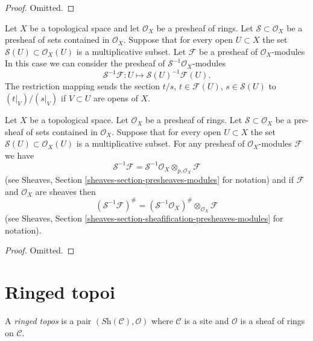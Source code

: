 \begin{proof}
Omitted.
\end{proof}

\noindent
Let $X$ be a topological space and let $\mathcal{O}_X$ be a
presheaf of rings. Let $\mathcal{S} \subset \mathcal{O}_X$
be a presheaf of sets contained in $\mathcal{O}_X$.
Suppose that for every open $U \subset X$ the set
$\mathcal{S}(U) \subset \mathcal{O}_X(U)$ is a multiplicative subset.
Let $\mathcal{F}$ be a presheaf of $\mathcal{O}_X$-modules
In this case we can consider the presheaf of
$\mathcal{S}^{-1}\mathcal{O}_X$-modules
$$
\mathcal{S}^{-1}\mathcal{F} :
U \longmapsto \mathcal{S}(U)^{-1}\mathcal{F}(U).
$$
The restriction mapping sends the section $t/s$, $t \in \mathcal{F}(U)$,
$s \in \mathcal{S}(U)$ to $(t|_V)/(s|_V)$ if $V \subset U$ are opens
of $X$.

\begin{lemma}
\label{lemma-simple-invert-module}
Let $X$ be a topological space.
Let $\mathcal{O}_X$ be a presheaf of rings.
Let $\mathcal{S} \subset \mathcal{O}_X$ be a pre-sheaf of sets contained
in $\mathcal{O}_X$. Suppose that for every open $U \subset X$ the set
$\mathcal{S}(U) \subset \mathcal{O}_X(U)$ is a multiplicative subset.
For any presheaf of $\mathcal{O}_X$-modules $\mathcal{F}$ we
have
$$
\mathcal{S}^{-1}\mathcal{F}
=
\mathcal{S}^{-1}\mathcal{O}_X \otimes_{p, \mathcal{O}_X} \mathcal{F}
$$
(see Sheaves, Section \ref{sheaves-section-presheaves-modules} for notation)
and if $\mathcal{F}$ and $\mathcal{O}_X$ are sheaves then
$$
(\mathcal{S}^{-1}\mathcal{F})^\#
=
(\mathcal{S}^{-1}\mathcal{O}_X)^\# \otimes_{\mathcal{O}_X} \mathcal{F}
$$
(see Sheaves, Section \ref{sheaves-section-sheafification-presheaves-modules}
for notation).
\end{lemma}

\begin{proof}
Omitted.
\end{proof}















\section{Ringed topoi}
\label{section-ringed-topoi}

\begin{definition}
\label{definition-ringed-topos}
A {\it ringed topos} is a pair $(\textit{Sh}(\mathcal{C}), \mathcal{O})$
where $\mathcal{C}$ is a site and $\mathcal{O}$ is a sheaf of rings
on $\mathcal{C}$.
\end{definition}










